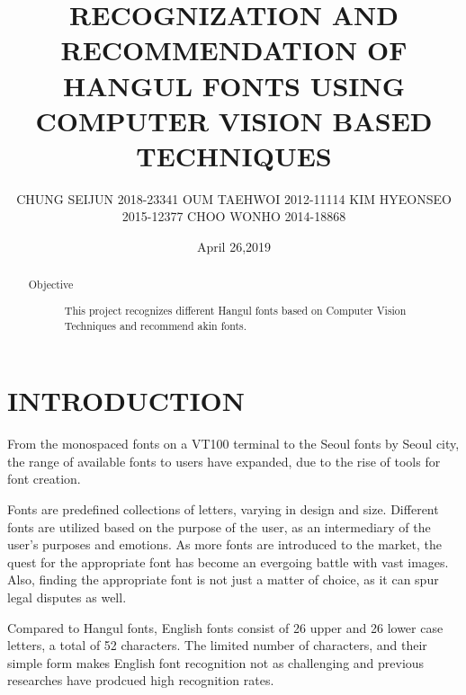 \documentclass[%
 reprint,
nofootinbib,
nobibnotes,
amsmath,amssymb,
aps,
]{revtex4-1}
\begin{document}
\titlespacing*{\subsection}{0pt}{\baselineskip}{\baselineskip}

\title{RECOGNIZATION AND RECOMMENDATION OF HANGUL FONTS USING COMPUTER VISION BASED
TECHNIQUES}%

\author{CHUNG SEIJUN 2018-23341 OUM TAEHWOI 2012-11114 KIM HYEONSEO  2015-12377
CHOO WONHO 2014-18868}
%
\date{April 26,2019}

\begin{abstract}
\begin{description}
\item[Objective]
This project recognizes different Hangul fonts based on Computer Vision
    Techniques and recommend akin fonts.
\end{description}
\end{abstract}

\maketitle


\section{\label{sec:level1}INTRODUCTION}
From the monospaced fonts on a VT100 terminal to the
Seoul fonts by Seoul city, the range of available fonts to users have expanded, due to the rise of tools for font creation.

Fonts are predefined collections of letters, varying in design and size.
Different fonts are utilized based on the purpose of the user, as an
intermediary of the user's purposes and emotions.
As more fonts are introduced to the market, the quest
for the appropriate font has become an evergoing battle with vast images.
Also, finding the appropriate font is not just a matter of choice, as it can spur legal disputes as well.\cite{lawsuit}

Compared to Hangul fonts, English fonts consist of 26 upper and 26 lower case
letters, a total of 52 characters. The limited number of characters, and their
simple form makes English font recognition not as challenging and previous
researches have prodcued high recognition rates.
\end{document}
